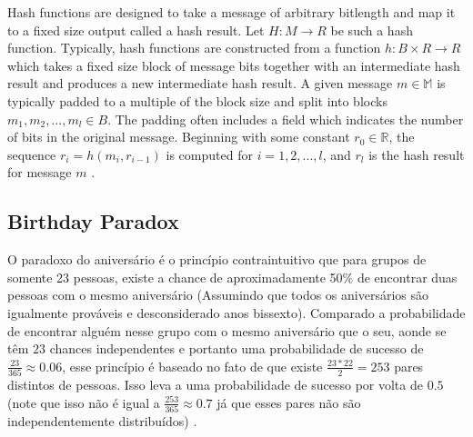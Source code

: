 \documentclass[12pt]{article}
\begin{document}
Hash functions are designed to take a message of arbitrary bitlength and map it to a fixed size
output called a hash result. Let \(H : M \to R\) be such a hash function. Typically, 
hash functions are constructed from a function \(h: B \times R \to R\) which takes a fixed size block 
of message bits together with an intermediate hash result and produces a new intermediate hash result. 
A given message \(m \in \mathbb{M}\) is typically padded to a multiple of the block size and split 
into blocks \(m_1, m_2, ... , m_l \in B\). The padding often includes a field which indicates the 
number of bits in the original message. Beginning with some constant \(r_0 \in \mathbb{R}\), the sequence 
\(r_i = h(m_i, r_{i-1})\) is computed for \(i = 1, 2, ... , l\), and \(r_l\) is the hash result for message 
\(m\) \cite{van1999parallel}.

\subsection{Birthday Paradox}

O paradoxo do aniversário é o princípio contraintuitivo que para grupos de somente 23 pessoas, existe a 
chance de aproximadamente 50\% de encontrar duas pessoas com o mesmo aniversário (Assumindo que
todos os aniversários são igualmente prováveis e desconsiderado anos bissexto). Comparado a probabilidade
de encontrar alguém nesse grupo com o mesmo aniversário que o seu, aonde se têm \(23\) chances independentes
e portanto uma probabilidade de sucesso de \(\frac{23}{365} \approx 0.06\), esse princípio é baseado
no fato de que existe \(\frac{23 * 22}{2} = 253\) pares distintos de pessoas. Isso leva a uma probabilidade
de sucesso por volta de \(0.5\) (note que isso não é igual a \(\frac{253}{365} \approx 0.7\) já que esses
pares não são independentemente distribuídos) \cite{stevens2012attacks}.

\iffalse
The birthday paradox is the counter-intuitive principle that for
groups of as few as \(23\) persons there is already a chance of about one half of finding two 
persons with the same birthday (assuming all birthdays are equally likely and disregarding 
leap years). Compared to finding someone in this group with your birthday where you have 
\(23\) independent chances and thus a success probability of \(\frac{23}{365} \approx 0.06\), this principle is 
based on the fact that there are \(\frac{23 * 22}{2} = 253\) distinct pairs of persons. This leads to 
a success probability of about \(0.5\) (note that this does not equal \(\frac{253}{365} \approx 0.7\) since these 
pairs are not independently distributed) \cite{stevens2012attacks}.
\fi
\end{document}
